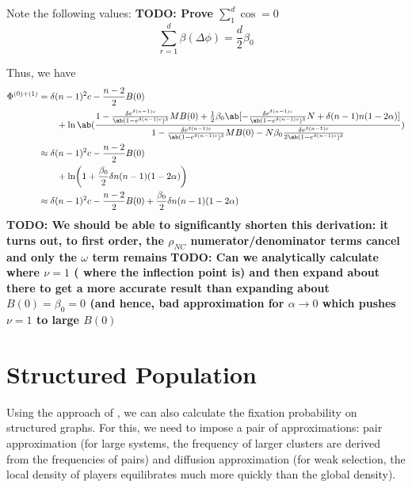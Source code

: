Note the following values:
\textbf{TODO: Prove $\sum_1^d \cos = 0$}
\begin{equation}
  \sum_{r=1}^d \beta(\Delta \phi) = \frac{d}{2} \beta_0
\end{equation}

Thus, we have
\begin{equation}
  \begin{aligned}
    \Phi^{(0)+(1)} &=
\delta(n-1)^2 c - \frac{n-2}{2} B(0) \\
  &\qquad +
\ln\ab(
\frac{
1 -
    \frac{\delta e^{\delta(n-1)c}}{\ab(1-e^{\delta (n-1)c})^3}
  M B(0)
+
\frac{1}{2}\beta_0\ab[
-
    \frac{\delta e^{\delta(n-1)c}}{\ab(1-e^{\delta (n-1)c})^3} N
    +
\delta (n-1) n (1 - 2 \alpha)
]
}
{1 -
    \frac{\delta e^{\delta(n-1)c}}{\ab(1-e^{\delta (n-1)c})^3}
  M B(0)
  - N \beta_0 \frac{\delta e^{\delta(n-1)c}}{2\ab(1-e^{\delta (n-1)c})^3}
                  }
  )
  \\
  &\approx
\delta(n-1)^2 c - \frac{n-2}{2} B(0) \\
  &\qquad +
\ln \biggl(
  1 + \frac{\beta_0}{2} \delta n (n-1) (1-2\alpha)
\biggr)
  \\
  &\approx
  \delta(n-1)^2 c - \frac{n-2}{2} B(0) +
  \frac{\beta_0}{2} \delta n (n-1) (1-2\alpha)
\end{aligned}
\label{eq:analytic_first_term}
\end{equation}
\textbf{TODO: We should be able to significantly shorten this
  derivation: it turns out, to first order, the $\rho_{NC}$
  numerator/denominator terms cancel and only the $\omega$ term remains}
\textbf{TODO: Can we analytically calculate where $\nu = 1$ (\ie{} where
  the inflection point is) and then expand about there to get a more
  accurate result than expanding about $B(0) = \beta_0 = 0$ (and hence,
  bad approximation for $\alpha \to 0$ which pushes $\nu=1$ to large
  $B(0)$}

\section{Structured Population}
Using the approach of \citet{ohtsuki2006simple},
we can also calculate the fixation probability
on structured graphs.
For this, we need to impose a pair of approximations:
pair approximation
(for large systems,
the frequency of larger clusters are derived from the frequencies of pairs)
and diffusion approximation
(for weak selection, the local density of players equilibrates
much more quickly than the global density).
